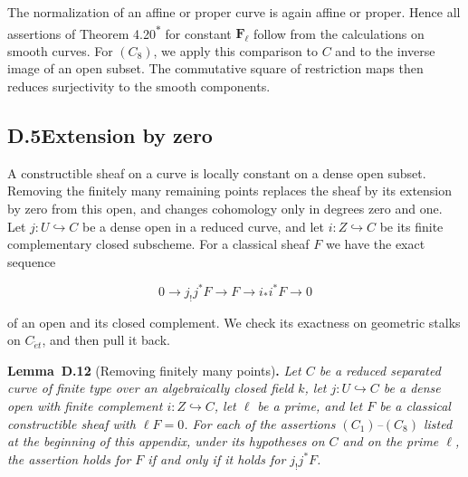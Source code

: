 \documentclass[11pt]{article}
\newenvironment{bpstatement}[2]{\par\addvspace{0.6\baselineskip}\noindent\textbf{#1}#2\textbf{.}\enspace\ignorespaces}
  {\par\addvspace{0.4\baselineskip}}
\newenvironment{bpstatementit}[2]{\begin{bpstatement}{#1}{#2}\itshape\ignorespaces}{\end{bpstatement}}
\newcommand{\bpout}[1]{#1\textsuperscript{\hyperlink{bp-outside}{\ensuremath{\ast}}}}
\begin{document}
The normalization of an affine or proper curve is again affine or proper. Hence all assertions of Theorem \bpout{4.20} for constant \(\mathbf F_\ell\) follow from the calculations on smooth curves. For \((C_8)\), we apply this comparison to \(C\) and to the inverse image of an open subset. The commutative square of restriction maps then reduces surjectivity to the smooth components.


\subsection*{\texorpdfstring{D.5\quad Extension by zero}{D.5 Extension by zero}}
\label{bp39}%
\label{bp40}%
A constructible sheaf on a curve is locally constant on a dense open subset. Removing the finitely many remaining points replaces the sheaf by its extension by zero from this open, and changes cohomology only in degrees zero and one. Let \(j:U\hookrightarrow C\) be a dense open in a reduced curve, and let \(i:Z\hookrightarrow C\) be its finite complementary closed subscheme. For a classical sheaf \(F\) we have the exact sequence

\[
0\longrightarrow j_!j^*F\longrightarrow F
\longrightarrow i_*i^*F\longrightarrow0
\]

of an open and its closed complement. We check its exactness on geometric stalks on \(C_{\acute{e}t}\), and then pull it back.

\label{bp41}%
\begin{bpstatementit}{Lemma~D.12}{ (Removing finitely many points)}
Let \(C\) be a reduced separated curve of finite type over an algebraically closed field \(k\), let \(j:U\hookrightarrow C\) be a dense open with finite complement \(i:Z\hookrightarrow C\), let \(\ell\) be a prime, and let \(F\) be a classical constructible sheaf with \(\ell F=0\). For each of the assertions \((C_1)\)–\((C_8)\) listed at the beginning of this appendix, under its hypotheses on \(C\) and on the prime \(\ell\), the assertion holds for \(F\) if and only if it holds for \(j_!j^*F\).
\end{bpstatementit}
\end{document}
